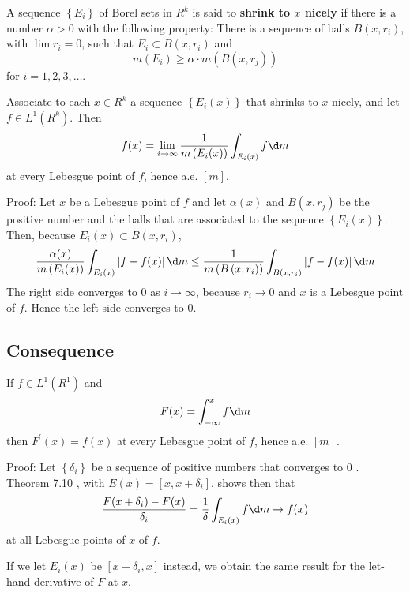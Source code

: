 \documentclass[12pt, a4paper, oneside]{book}
\begin{document}
\begin{definition}
    A sequence $\left\{E_i\right\}$ of Borel sets in $R^k$ is said to \textbf{shrink to $x$ nicely} if there is a number $\alpha>0$ with the following property: There is a sequence of balls $B\left(x, r_i\right)$, with $\lim r_i=0$, such that $E_i \subset B\left(x, r_i\right)$ and
    \begin{equation*}
        m\left(E_i\right) \geq \alpha \cdot m\left(B\left(x, r_j\right)\right)
    \end{equation*}
    for $i=1,2,3, \ldots$.
\end{definition}



\begin{theorem}
    Associate to each $x \in R^k $ a sequence $\left\{E_i(x)\right\}$ that shrinks to $x$ nicely, and let $f \in L^1\left(R^k\right)$. Then
    \begin{equation*}
        f(x)
        =
        \lim_{i \to\infty} \frac{1}{m\left(E_i(x)\right)} \int_{E_i(x)} f \d m
    \end{equation*}
    at every Lebesgue point of $f$, hence a.e. $[m]$.

    Proof:
    Let $x$ be a Lebesgue point of $f$ and let $\alpha(x)$ and $B\left(x, r_j\right)$ be the positive number and the balls that are associated to the sequence $\left\{E_i (x)\right\}$. Then, because $E_i(x) \subset B\left(x, r_i\right)$,
    \begin{equation*}
        \frac{\alpha(x)}{m\left(E_i(x)\right)}
        \int_{E_i(x)} \left|f-f(x)\right| \d m
        \leq
        \frac{1}{m\left(B\left(x, r_i\right)\right)} \int_{B(x, r_i)}\left|f-f(x)\right| \d m
    \end{equation*}
    The right side converges to $0$ as $i \to \infty$, because $r_i \rightarrow 0$ and $x$ is a Lebesgue point of $f$. Hence the left side converges to $0$.
\end{theorem}


\subsection{Consequence}

\begin{theorem}
    If $f \in L^1\left(R^1\right)$ and
    \begin{equation*}
        F(x)
        =
        \int_{-\infty}^x f \d m
    \end{equation*}
    then $F^{\prime}(x)=f(x)$ at every Lebesgue point of $f$, hence a.e. $[m]$.

    Proof:
    Let $\left\{\delta_i\right\}$ be a sequence of positive numbers that converges to $0$ .
    Theorem 7.10 , with $E(x)=\left[x, x+\delta_i\right]$, shows then that
    \begin{equation*}
        \frac{F(x+\delta_i)-F(x)}{\delta_i}
        =
        \frac{1}{\delta} \int_{E_i(x)} f \d m
        \to f(x)
    \end{equation*}
    at all Lebesgue points of $x$ of $f$.

    If we let $E_i(x)$ be $\left[x-\delta_i, x\right]$ instead, we obtain the same result for the let-hand derivative of $F$ at $x$.
\end{theorem}
\end{document}
